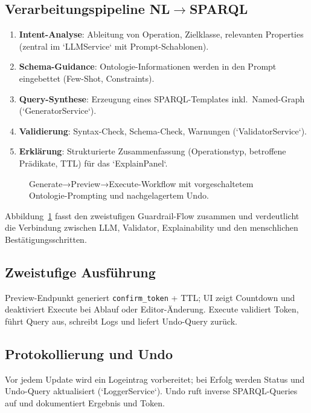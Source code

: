 \subsection{Verarbeitungspipeline NL\texorpdfstring{$\rightarrow$}{→}SPARQL}
\begin{enumerate}
  \item \textbf{Intent-Analyse}: Ableitung von Operation, Zielklasse, relevanten Properties (zentral im `LLMService` mit Prompt-Schablonen).
  \item \textbf{Schema-Guidance}: Ontologie-Informationen werden in den Prompt eingebettet (Few-Shot, Constraints).
  \item \textbf{Query-Synthese}: Erzeugung eines SPARQL-Templates inkl.\ Named-Graph (`GeneratorService`).
  \item \textbf{Validierung}: Syntax-Check, Schema-Check, Warnungen (`ValidatorService`).
  \item \textbf{Erklärung}: Strukturierte Zusammenfassung (Operationstyp, betroffene Prädikate, TTL) für das `ExplainPanel`.
\end{enumerate}

\begin{figure}[ht]
  \centering
  
  \caption{Generate→Preview→Execute-Workflow mit vorgeschaltetem Ontologie-Prompting und nachgelagertem Undo.}
  \label{fig:workflow}
\end{figure}

Abbildung~\ref{fig:workflow} fasst den zweistufigen Guardrail-Flow zusammen und verdeutlicht die Verbindung zwischen LLM, Validator, Explainability und den menschlichen Bestätigungsschritten.

\subsection{Zweistufige Ausführung}
Preview-Endpunkt generiert \texttt{confirm\_token} + TTL; UI zeigt Countdown und deaktiviert Execute bei Ablauf oder Editor-Änderung. Execute validiert Token, führt Query aus, schreibt Logs und liefert Undo-Query zurück.

\subsection{Protokollierung und Undo}
Vor jedem Update wird ein Logeintrag vorbereitet; bei Erfolg werden Status und Undo-Query aktualisiert (`LoggerService`). Undo ruft inverse SPARQL-Queries auf und dokumentiert Ergebnis und Token.

